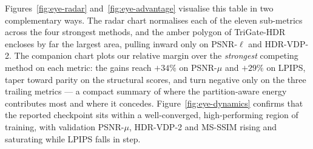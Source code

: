 \documentclass[10pt,twocolumn,letterpaper]{article}
\begin{document}
Figures~\ref{fig:eye-radar} and~\ref{fig:eye-advantage} visualise this table in two complementary ways. The radar chart normalises each of the eleven sub-metrics across the four strongest methods, and the amber polygon of TriGate-HDR encloses by far the largest area, pulling inward only on PSNR-$\ell$ and HDR-VDP-2. The companion chart plots our relative margin over the \emph{strongest} competing method on each metric: the gains reach $+34\%$ on PSNR-$\mu$ and $+29\%$ on LPIPS, taper toward parity on the structural scores, and turn negative only on the three trailing metrics --- a compact summary of where the partition-aware energy contributes most and where it concedes. Figure~\ref{fig:eye-dynamics} confirms that the reported checkpoint sits within a well-converged, high-performing region of training, with validation PSNR-$\mu$, HDR-VDP-2 and MS-SSIM rising and saturating while LPIPS falls in step.
\end{document}
